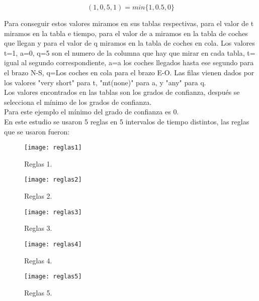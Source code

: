 $$(1,0,5,1)=min\{1, 0.5, 0\}$$

Para conseguir estos valores miramos en sus tablas respectivas, para el valor de t miramos en la tabla e tiempo, para el valor de a miramos en la tabla de coches que llegan y para el valor de q miramos en la tabla de coches en cola. Los valores t=1, a=0, q=5 son el numero de la columna que hay que mirar en cada tabla, t= igual al segundo correspondiente, a=a los coches llegados hasta ese segundo para el brazo N-S, q=Los coches en cola para el brazo E-O. Las filas vienen dados por los valores "very short" para t, "mt(none)" para a, y "any" para q.\\
Los valores encontrados en las tablas son los grados de confianza, después se selecciona el mínimo de los grados de confianza.\\
Para este ejemplo el mínimo del grado de confianza es 0.\\

En este estudio se usaron 5 reglas en 5 intervalos de tiempo distintos, las reglas que se usaron fueron:\\
\newpage
\begin{multicols}{2}
\begin{figure}[H]
	\texttt{[image: reglas1]}
	\centering
	\caption{Reglas 1.}
	
\end{figure}

\begin{figure}[H]
	\texttt{[image: reglas2]}
	\centering
	\caption{Reglas 2.}
	
\end{figure}
\end{multicols}
\newpage
\begin{multicols}{2}
\begin{figure}[H]
	\texttt{[image: reglas3]}
	\centering
	\caption{Reglas 3.}

\end{figure}

\begin{figure}[H]
	\texttt{[image: reglas4]}
	\centering
	\caption{Reglas 4.}

\end{figure}

\begin{figure}[H]
	\texttt{[image: reglas5]}
	\centering
	\caption{Reglas 5.}


\end{figure}
\end{multicols}
 
